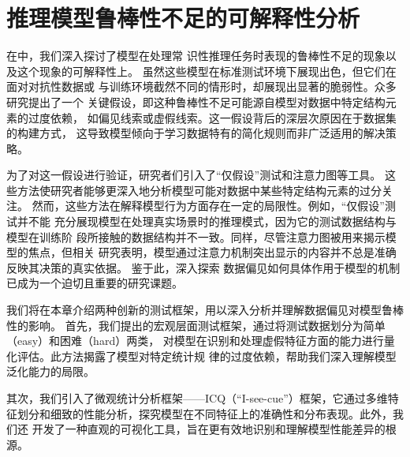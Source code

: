 \section{推理模型鲁棒性不足的可解释性分析}



%

在中，我们深入探讨了模型在处理常
识性推理任务时表现的鲁棒性不足的现象以及这个现象的可解释性上。
虽然这些模型在标准测试环境下展现出色，但它们在面对对抗性数据或
与训练环境截然不同的情形时，却展现出显著的脆弱性。众多研究提出了一个
关键假设，即这种鲁棒性不足可能源自模型对数据中特定结构元素的过度依赖，
如偏见线索或虚假线索。这一假设背后的深层次原因在于数据集的构建方式，
这导致模型倾向于学习数据特有的简化规则而非广泛适用的解决策略。

为了对这一假设进行验证，研究者们引入了``仅假设''测试和注意力图等工具。
这些方法使研究者能够更深入地分析模型可能对数据中某些特定结构元素的过分关注。
然而，这些方法在解释模型行为方面存在一定的局限性。例如，``仅假设''测试并不能
充分展现模型在处理真实场景时的推理模式，因为它的测试数据结构与模型在训练阶
段所接触的数据结构并不一致。同样，尽管注意力图被用来揭示模型的焦点，但相关
研究表明，模型通过注意力机制突出显示的内容并不总是准确反映其决策的真实依据。
鉴于此，深入探索
数据偏见如何具体作用于模型的机制已成为一个迫切且重要的研究课题。

我们将在本章介绍两种创新的测试框架，用以深入分析并理解数据偏见对模型鲁棒性的影响。
首先，我们提出的宏观层面测试框架，通过将测试数据划分为简单（easy）和困难（hard）两类，
对模型在识别和处理虚假特征方面的能力进行量化评估。此方法揭露了模型对特定统计规
律的过度依赖，帮助我们深入理解模型泛化能力的局限。

其次，我们引入了微观统计分析框架——ICQ（``I-see-cue''）框架，它通过多维特
征划分和细致的性能分析，探究模型在不同特征上的准确性和分布表现。此外，我们还
开发了一种直观的可视化工具，旨在更有效地识别和理解模型性能差异的根源。

